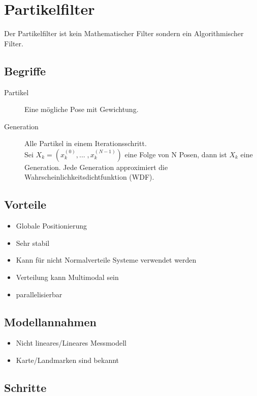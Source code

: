 \chapter{Partikelfilter}
\label{chp:partikelfilter}

Der Partikelfilter ist kein Mathematischer Filter sondern ein Algorithmischer Filter. \\

\section{Begriffe}
\begin{description}
	\item[Partikel] Eine mögliche Pose mit Gewichtung. 
	\item[Generation] Alle Partikel in einem Iterationsschritt. \\Sei $X_k = (x_k^{(0)},...\;,x_k^{(N-1)})$ eine Folge von N Posen, dann ist $X_k$ eine Generation. Jede Generation approximiert die Wahrscheinlichkeitsdichtfunktion (WDF).
\end{description}

\section{Vorteile}
\begin{itemize}
	\item Globale Positionierung
	\item Sehr stabil
	\item Kann für nicht Normalverteile Systeme verwendet werden
	\item Verteilung kann Multimodal sein
	\item parallelisierbar
\end{itemize}

\section{Modellannahmen}

\begin{itemize}
	\item Nicht lineares/Lineares Messmodell
	\item Karte/Landmarken sind bekannt
\end{itemize}


\newpage
\section{Schritte}

